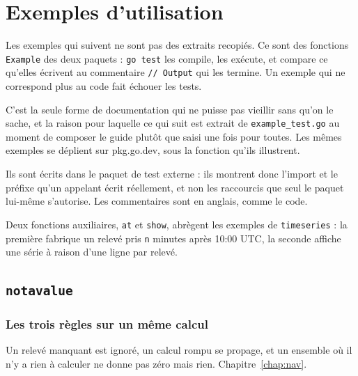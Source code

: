%
%

\appendix

\chapter{Exemples d'utilisation}\label{chap:exemples}

Les exemples qui suivent ne sont pas des extraits recopiés. Ce sont des
fonctions \texttt{Example} des deux paquets : \texttt{go\ test} les
compile, les exécute, et compare ce qu'elles écrivent au commentaire
\texttt{//\ Output} qui les termine. Un exemple qui ne correspond plus
au code fait échouer les tests.

C'est la seule forme de documentation qui ne puisse pas vieillir sans
qu'on le sache, et la raison pour laquelle ce qui suit est extrait de
\texttt{example\_test.go} au moment de composer le guide plutôt que
saisi une fois pour toutes. Les mêmes exemples se déplient sur
pkg.go.dev, sous la fonction qu'ils illustrent.

Ils sont écrits dans le paquet de test externe : ils montrent donc
l'import et le préfixe qu'un appelant écrit réellement, et non les
raccourcis que seul le paquet lui-même s'autorise. Les commentaires
sont en anglais, comme le code.

Deux fonctions auxiliaires, \texttt{at} et \texttt{show}, abrègent les
exemples de \texttt{timeseries} : la première fabrique un relevé pris
\texttt{n} minutes après 10:00 UTC, la seconde affiche une série à
raison d'une ligne par relevé.

\section{\texttt{notavalue}}

\subsection{Les trois règles sur un même calcul}

Un relevé manquant est ignoré, un calcul rompu se propage, et un
ensemble où il n'y a rien à calculer ne donne pas zéro mais rien.
Chapitre~\ref{chap:nav}.

